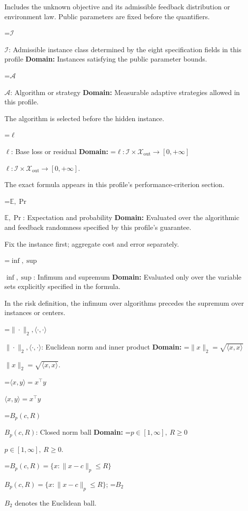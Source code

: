 \documentclass[10pt,a4paper]{article}
\newcommand{\AtlasMath}[1]{\par\begingroup\centering\setbox0=\hbox{$\displaystyle #1$}\ifdim\wd0>1.4\linewidth\typeout{ATLAS WIDE FORMULA: \the\wd0}\fi\ifdim\wd0>\linewidth\resizebox{\linewidth}{!}{\box0}\else\box0\fi\par\endgroup}
\newcommand{\AtlasInlineMath}[1]{\begingroup\setbox0=\hbox{$#1$}\ifdim\wd0>.4\linewidth\endgroup\AtlasMath{#1}\else\endgroup$#1$\fi}
\begin{document}
Includes the unknown objective and its admissible feedback distribution or environment law. Public parameters are fixed before the quantifiers.



\AtlasInlineMath{\mathcal{I}}: Admissible instance class determined by the eight specification fields in this profile \textbf{Domain:} Instances satisfying the public parameter bounds.



\AtlasInlineMath{\mathcal{A}}: Algorithm or strategy \textbf{Domain:} Measurable adaptive strategies allowed in this profile.



The algorithm is selected before the hidden instance.



\AtlasInlineMath{\ell}: Base loss or residual \textbf{Domain:} \AtlasInlineMath{\ell:\mathcal{I}\times\mathcal{X}_{\mathrm{out}}\to[0,+\infty]}.



The exact formula appears in this profile's performance-criterion section.



\AtlasInlineMath{\mathbb{E},\Pr}: Expectation and probability \textbf{Domain:} Evaluated over the algorithmic and feedback randomness specified by this profile's guarantee.



Fix the instance first; aggregate cost and error separately.



\AtlasInlineMath{\inf,\sup}: Infimum and supremum \textbf{Domain:} Evaluated only over the variable sets explicitly specified in the formula.



In the risk definition, the infimum over algorithms precedes the supremum over instances or centers.



\AtlasInlineMath{\|\cdot\|_2,\langle\cdot,\cdot\rangle}: Euclidean norm and inner product \textbf{Domain:} \AtlasInlineMath{\|x\|_2=\sqrt{\langle x,x\rangle}}.



\AtlasInlineMath{\langle x,y\rangle=x^\top y}



\AtlasInlineMath{B_p(c,R)}: Closed norm ball \textbf{Domain:} \AtlasInlineMath{p\in[1,\infty],\ R\ge0}.



\AtlasInlineMath{B_p(c,R)=\{x:\|x-c\|_p\le R\}}; \AtlasInlineMath{B_2} denotes the Euclidean ball.
\end{document}
